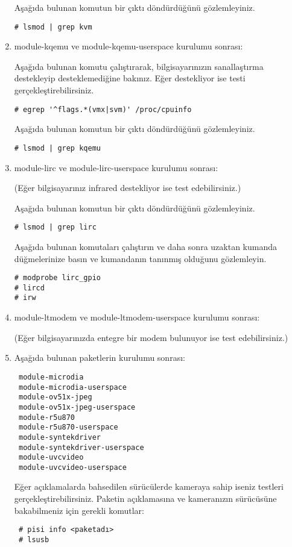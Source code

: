\documentclass[a4paper,10pt]{article}
\begin{document}
\begin{enumerate}
Aşağıda bulunan komutun bir çıktı döndürdüğünü gözlemleyiniz.
\begin{verbatim}
# lsmod | grep kvm
\end{verbatim}

\item module-kqemu ve module-kqemu-userspace kurulumu sonrası:

Aşağıda bulunan komutu çalıştırarak, bilgisayarınızın sanallaştırma destekleyip desteklemediğine bakınız. Eğer destekliyor ise testi gerçekleştirebilirsiniz. 
\begin{verbatim}
# egrep '^flags.*(vmx|svm)' /proc/cpuinfo
\end{verbatim}

Aşağıda bulunan komutun bir çıktı döndürdüğünü gözlemleyiniz.
\begin{verbatim}
# lsmod | grep kqemu
\end{verbatim}

\item module-lirc ve module-lirc-userspace kurulumu sonrası:

(Eğer bilgisayarınız infrared destekliyor ise test edebilirsiniz.)

Aşağıda bulunan komutun bir çıktı döndürdüğünü gözlemleyiniz.
\begin{verbatim}
# lsmod | grep lirc
\end{verbatim}

Aşağıda bulunan komutaları çalıştırın ve daha sonra uzaktan kumanda düğmelerinize basın ve kumandanın tanınmış olduğunu gözlemleyin.
\begin{verbatim}
# modprobe lirc_gpio
# lircd
# irw  
\end{verbatim}
\item module-ltmodem ve module-ltmodem-userspace kurulumu sonrası:

(Eğer bilgisayarınızda entegre bir modem bulunuyor ise test edebilirsiniz.)


\item Aşağıda bulunan paketlerin kurulumu sonrası:
\begin{verbatim}
 module-microdia
 module-microdia-userspace
 module-ov51x-jpeg
 module-ov51x-jpeg-userspace
 module-r5u870
 module-r5u870-userspace
 module-syntekdriver
 module-syntekdriver-userspace
 module-uvcvideo
 module-uvcvideo-userspace
\end{verbatim}

Eğer açıklamalarda bahsedilen sürücülerde kameraya sahip iseniz testleri gerçekleştirebilirsiniz.
Paketin açıklamasına ve kameranızın sürücüsüne bakabilmeniz için gerekli komutlar:
\begin{verbatim}
 # pisi info <paketadı>
 # lsusb
\end{verbatim}


\end{enumerate}
\end{document}
